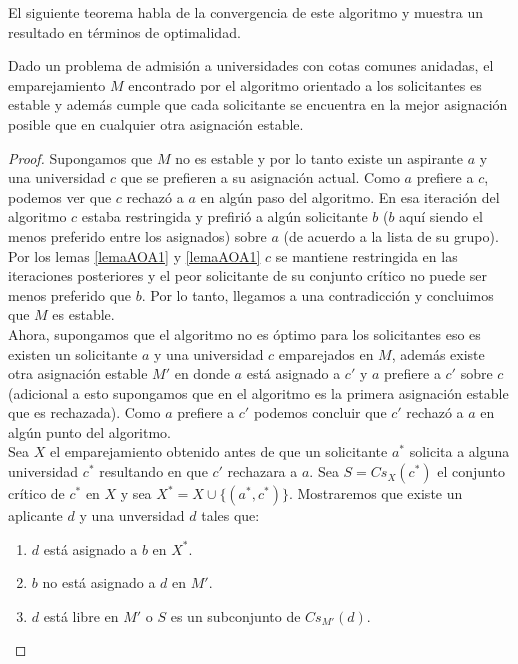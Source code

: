 El siguiente teorema habla de la convergencia de este algoritmo y muestra un resultado en términos de optimalidad.

\begin{teo}
Dado un problema de admisión a universidades con cotas comunes anidadas, el emparejamiento $M$ encontrado por el algoritmo orientado a los solicitantes es estable y además cumple que cada solicitante se encuentra en la mejor asignación posible que en cualquier otra asignación estable.
\end{teo}

\begin{proof}
Supongamos que $M$ no es estable y por lo tanto existe un aspirante $a$ y una universidad $c$ que se prefieren a su asignación actual. Como $a$ prefiere a $c$, podemos ver que $c$ rechazó a $a$ en algún paso del algoritmo. En esa iteración del algoritmo $c$ estaba restringida y prefirió a algún solicitante $b$ ($b$ aquí siendo el menos preferido entre los asignados) sobre $a$ (de acuerdo a la lista de su grupo). Por los lemas \ref{lemaAOA1} y \ref{lemaAOA1} $c$ se mantiene restringida en las iteraciones posteriores y el peor solicitante de su conjunto crítico no puede ser menos preferido que $b$. Por lo tanto, llegamos a una contradicción y concluimos que $M$ es estable. \\
Ahora, supongamos que el algoritmo no es óptimo para los solicitantes eso es existen un solicitante $a$ y una universidad $c$ emparejados en $M$, además existe otra asignación estable $M'$ en donde $a$ está asignado a $c'$ y $a$ prefiere a $c'$ sobre $c$ (adicional a esto supongamos que en el algoritmo es la primera asignación estable que es rechazada). Como $a$ prefiere a $c'$ podemos concluir que $c'$ rechazó a $a$ en algún punto del algoritmo. \\
Sea $X$ el emparejamiento obtenido antes de que un solicitante $a^*$ solicita a alguna universidad $c^*$ resultando en que $c'$ rechazara a $a$. Sea $S=Cs_X(c^*)$ el conjunto crítico de $c^*$ en $X$ y sea $X^*=X \cup \{(a^*,c^*)\}$. Mostraremos que existe un aplicante $d$ y una unversidad $d$ tales que:
\begin{enumerate}
\item $d$ está asignado a $b$ en $X^*$.
\item $b$ no está asignado a $d$ en $M'$.
\item $d$ está libre en $M'$ o $S$ es un subconjunto de $Cs_{M'}(d)$.
\end{enumerate}

\end{proof}
